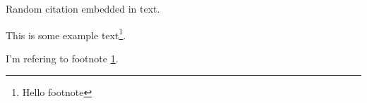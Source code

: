 \documentclass{article}
\begin{document}
Random citation \autocite{DUMMY1} embedded in text.

This is some example text\footnote{\label{myfootnote}Hello footnote}.

I'm refering to footnote \ref{myfootnote}.

\newpage

%
%
\printbibliography
\end{document}
